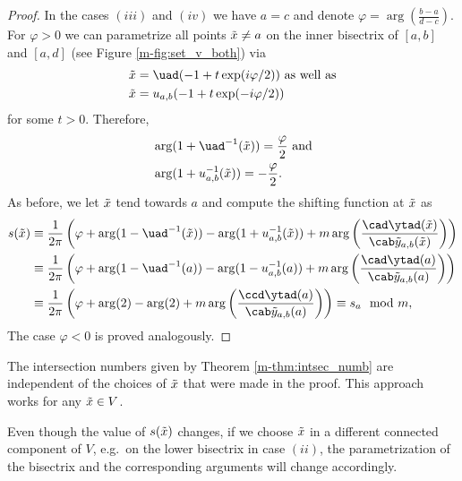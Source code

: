 \documentclass[main.tex]{subfiles}
\begin{document}
\begin{proof}
  In the cases $(iii)$ and $(iv)$ we have $a = c$ and denote $\varphi =  \arg \left( \frac{b-a}{d-c} \right)$. For $\varphi > 0$ we can parametrize all points $\tilde{x} \ne a$ on the inner
  bisectrix of $[a,b]$ and $[a,d]$ (see Figure \ref{m-fig:set_v_both}) via
 \begin{align*}
  \xt & = \uad(-1+t \exp(i \varphi /2)) \text{  as well as} \\
  \xt & = \uab(-1+t \exp(-i \varphi/2))
 \end{align*}
 for some $t > 0$. Therefore,
 \begin{align*}
   & \arg (1+\uad^{-1}(\xt)) = \frac{\varphi}{2} \text{ and} \\
   & \arg (1+\uab^{-1}(\xt)) = -\frac{\varphi}{2}.
 \end{align*}
 As before, we let $\tilde{x}$ tend towards $a$ and compute the shifting function at $\tilde{x}$ as
 \begin{align*}
  s(\xt) & \equiv \frac{1}{2\pi} \left( \varphi + \arg(1-\uad^{-1}(\xt)) - \arg(1+\uab^{-1}(\xt)) +  m \arg \left( \frac{ \cad \ytad(\xt)}{\cab\ytab(\xt)} \right)\right) \\
	 & \equiv \frac{1}{2\pi} \left ( \varphi +\arg(1-\uad^{-1}(a)) - \arg(1-\uab^{-1}(a)) +  m \arg \left( \frac{ \cad \ytad(a)}{\cab\ytab(a)} \right)\right) \\
	 & \equiv \frac{1}{2\pi} \left( \varphi +\arg(2) - \arg(2) +  m \arg \left( \frac{ \ccd \ytad(a)}{\cab\ytab(a)} \right)\right) \equiv s_a \mod m,
 \end{align*}
 The case $\varphi < 0$ is proved analogously.
\end{proof} 

\begin{rmk}
  The intersection numbers given by Theorem \ref{m-thm:intsec_numb} are independent of the choices of $\tilde{x}$ that were made in the proof. This approach works for any $\tilde{x} \in V$.
  
  Even though the value of
  $s(\tilde{x})$ changes, if we choose $\tilde{x}$ in a different connected component of $V$, e.g.\ on the lower bisectrix in case $(ii)$,  
  the parametrization of the bisectrix and the corresponding arguments will change accordingly.
\end{rmk}
\end{document}
